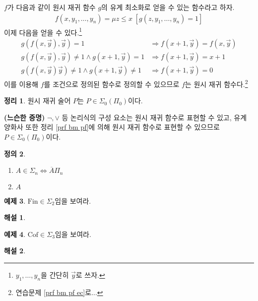 \documentclass[b5paper, 11pt]{book}
\theoremstyle{definition}
\newtheorem{defn}{정의}[chapter]
\newtheorem{thm}[defn]{정리}
\newtheorem{ex}[defn]{예제}
\newtheorem*{ans*}{해설}
\newenvironment{pf*}{\pushQED{\qed}\pf}
{\popQED\endpf}
\begin{document}
\begin{pf*}
    $f$가 다음과 같이 원시 재귀 함수 $g$의 유계 최소화로 얻을 수 있는 함수라고 하자.
    \begin{align*}
        f(x, y_1, \ldots, y_n) = \mu z \le x \; [g(z, y_1, \ldots, y_n) = 1]
    \end{align*}
    이제 다음을 얻을 수 있다.\footnote{$y_1, \ldots, y_n$을 간단히 $\vec{y}$로 쓰자.}
    \begin{align*}
        g(f(x, \vec{y}), \vec{y}) = 1 &\Rightarrow f(x+1, \vec{y}) = f(x, \vec{y}) \\ 
        g(f(x, \vec{y}), \vec{y}) \neq 1 \wedge g(x+1, \vec{y}) = 1 &\Rightarrow f(x+1,\vec{y}) = x + 1 \\ 
        g(f(x, \vec{y}) \vec{y}) \neq 1 \wedge g(x+1, \vec{y}) \neq 1 &\Rightarrow f(x+1, \vec{y}) = 0
    \end{align*}
    이를 이용해 $f$를 조건으로 정의된 함수로 정의할 수 있으므로 $f$는 원시 재귀 함수다.\footnote{연습문제 \ref{prf bm pf ec}로...}
\end{pf*}
\begin{thm}
    원시 재귀 술어 $P$는 $P \in \Sigma_0 (\Pi_0)$이다.
\end{thm}
\begin{pf*}
    \textbf{(느슨한 증명)} $ \neg, \vee$ 등 논리식의 구성 요소는 원시 재귀 함수로 표현할 수 있고, 유계 양화사 또한 정리 \ref{prf bm pf}에 의해 원시 재귀 함수로 표현할 수 있으므로 $P \in \Sigma_0 (\Pi_0)$이다.
\end{pf*}
\begin{defn}
    \begin{enumerate}
        \item $A \in \Sigma_n \Leftrightarrow \overline{A} \Pi_n$
        \item $A $
    \end{enumerate}
\end{defn}
\begin{ex}
    $\mathrm{Fin} \in \Sigma_2$임을 보여라.
\end{ex}
\begin{ans*}
    
\end{ans*}
\begin{ex}
    $\mathrm{Cof} \in \Sigma_3$임을 보여라.
\end{ex}
\begin{ans*}
    
\end{ans*}
\end{document}
